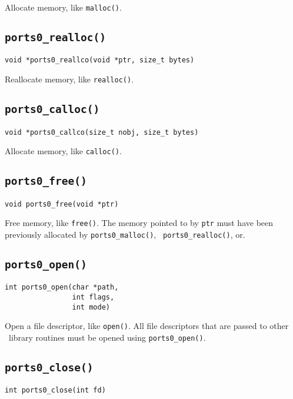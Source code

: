 Allocate memory, like {\tt malloc()}.


\subsection{\tt ports0\_realloc()}
\begin{verbatim}
void *ports0_reallco(void *ptr, size_t bytes)
\end{verbatim}

Reallocate memory, like {\tt realloc()}.


\subsection{\tt ports0\_calloc()}
\begin{verbatim}
void *ports0_callco(size_t nobj, size_t bytes)
\end{verbatim}

Allocate memory, like {\tt calloc()}.


\subsection{\tt ports0\_free()}
\begin{verbatim}
void ports0_free(void *ptr)
\end{verbatim}

Free memory, like {\tt free()}.  The memory pointed to by {\tt ptr}
must have been previously allocated by {\tt ports0\_malloc()}, {\tt
ports0\_realloc()}, or.


\subsection{\tt ports0\_open()}
\begin{verbatim}
int ports0_open(char *path,
                int flags,
                int mode)
\end{verbatim}

Open a file descriptor, like {\tt open()}.  All file descriptors that
are passed to other \portszero\ library routines must be opened using
{\tt ports0\_open()}.


\subsection{\tt ports0\_close()}
\begin{verbatim}
int ports0_close(int fd)
\end{verbatim}

